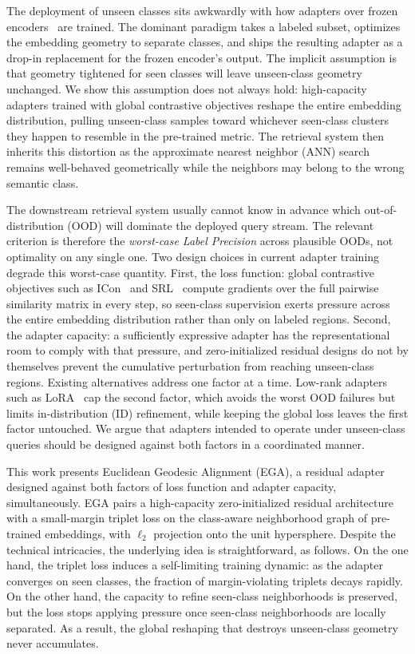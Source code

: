 \documentclass{article}
\begin{document}
The deployment of unseen classes sits awkwardly with how adapters over frozen encoders~\cite{clip_icml21,oquab2024dinov,10377550} are trained.
The dominant paradigm takes a labeled subset, optimizes the embedding geometry to separate classes, and ships the resulting adapter as a drop-in replacement for the frozen encoder's output.
The implicit assumption is that geometry tightened for seen classes will leave unseen-class geometry unchanged.
We show this assumption does not always hold: high-capacity adapters trained with global contrastive objectives reshape the entire embedding distribution, pulling unseen-class samples toward whichever seen-class clusters they happen to resemble in the pre-trained metric.
The retrieval system then inherits this distortion as the approximate nearest neighbor (ANN) search remains well-behaved geometrically while the neighbors may belong to the wrong semantic class.

The downstream retrieval system usually cannot know in advance which out-of-distribution (OOD) will dominate the deployed query stream.
The relevant criterion is therefore the \emph{worst-case Label Precision} across plausible OODs, not optimality on any single one.
Two design choices in current adapter training degrade this worst-case quantity.
First, the loss function: global contrastive objectives such as ICon~\cite{alshammariunifying} and SRL~\cite{dong2025improve} compute gradients over the full pairwise similarity matrix in every step, so seen-class supervision exerts pressure across the entire embedding distribution rather than only on labeled regions.
Second, the adapter capacity: a sufficiently expressive adapter has the representational room to comply with that pressure, and zero-initialized residual designs do not by themselves prevent the cumulative perturbation from reaching unseen-class regions.
Existing alternatives address one factor at a time.
Low-rank adapters such as LoRA~\cite{hu2022lora} cap the second factor, which avoids the worst OOD failures but limits in-distribution (ID) refinement, while keeping the global loss leaves the first factor untouched.
We argue that adapters intended to operate under unseen-class queries should be designed against both factors in a coordinated manner.

This work presents Euclidean Geodesic Alignment (EGA), a residual adapter designed against both factors of loss function and adapter capacity, simultaneously.
EGA pairs a high-capacity zero-initialized residual architecture with a small-margin triplet loss on the class-aware neighborhood graph of pre-trained embeddings, with $\ell_2$ projection onto the unit hypersphere.
Despite the technical intricacies, the underlying idea is straightforward, as follows.
On the one hand, the triplet loss induces a self-limiting training dynamic: as the adapter converges on seen classes, the fraction of margin-violating triplets decays rapidly.
On the other hand, the capacity to refine seen-class neighborhoods is preserved, but the loss stops applying pressure once seen-class neighborhoods are locally separated.
As a result, the global reshaping that destroys unseen-class geometry never accumulates.
\end{document}
